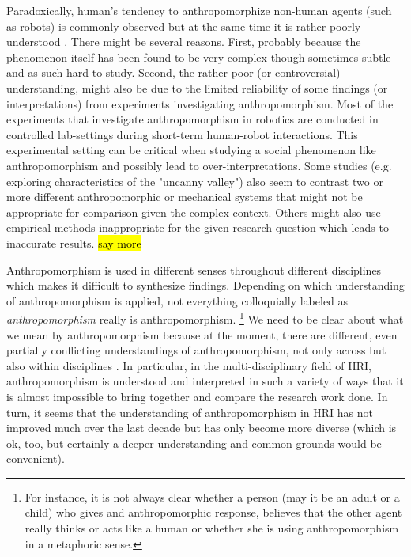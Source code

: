 \documentclass{frontiersSCNS} %
\begin{document}
Paradoxically, human's tendency to anthropomorphize non-human agents (such as
robots) is commonly observed but at the same time it is rather poorly understood
\cite{epley_seeing_2007}. There might be several reasons. First, probably
because the phenomenon itself has been found to be very complex though sometimes
subtle and as such hard to study. Second, the rather poor (or controversial)
understanding, might also be due to the limited reliability of some findings (or
interpretations) from experiments investigating anthropomorphism. Most of the
experiments that investigate anthropomorphism in robotics are conducted in
controlled lab-settings during short-term human-robot interactions. This
experimental setting can be critical when studying a social phenomenon like
anthropomorphism and possibly lead to over-interpretations. Some studies (e.g.
exploring characteristics of the "uncanny valley") also seem to contrast two or
more different anthropomorphic or mechanical systems that might not be
appropriate for comparison given the complex context. Others might also use
empirical methods inappropriate for the given research question which leads to
inaccurate results. \hl{say more}


Anthropomorphism is used in different senses throughout different disciplines 
\citep{duffy_anthropomorphism_2003} which makes it difficult to synthesize findings. 
Depending on which understanding of anthropomorphism is applied, not everything 
colloquially labeled as \emph{anthropomorphism} really is anthropomorphism.
\footnote{For instance, it is not always clear whether a person (may it be an adult or 
a child) who gives and anthropomorphic response, believes that the other agent really 
thinks or acts like a human or whether she is using anthropomorphism in a metaphoric 
sense.\citep{leeds_childrens_1992}} We need to be clear about what we mean by 
anthropomorphism because at the moment, there are different, even partially conflicting 
understandings of anthropomorphism, not only across but also within disciplines 
\cite{duffy_anthropomorphism_2002}. In particular, in the multi-disciplinary field of 
HRI, anthropomorphism is understood and interpreted in such a variety of ways that it 
is almost impossible to bring together and compare the research work done. In turn, it 
seems that the understanding of anthropomorphism in HRI has not improved much over the last decade but has only become more diverse (which is ok, too, but certainly a deeper 
understanding and common grounds would be convenient). 
\end{document}

